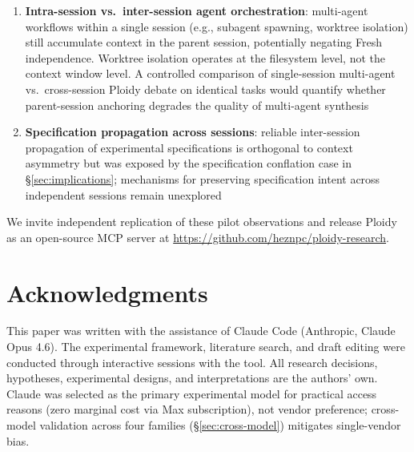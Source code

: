 \documentclass[11pt]{article}
\begin{document}
\begin{enumerate}[label=\arabic*., leftmargin=1.5em]
  \item \textbf{Intra-session vs.\ inter-session agent orchestration}: multi-agent workflows within a single session (e.g., subagent spawning, worktree isolation) still accumulate context in the parent session, potentially negating Fresh independence. Worktree isolation operates at the filesystem level, not the context window level. A controlled comparison of single-session multi-agent vs.\ cross-session Ploidy debate on identical tasks would quantify whether parent-session anchoring degrades the quality of multi-agent synthesis
  \item \textbf{Specification propagation across sessions}: reliable inter-session propagation of experimental specifications is orthogonal to context asymmetry but was exposed by the specification conflation case in \S\ref{sec:implications}; mechanisms for preserving specification intent across independent sessions remain unexplored
\end{enumerate}

We invite independent replication of these pilot observations and release Ploidy as an open-source MCP server at \url{https://github.com/heznpc/ploidy-research}.

\section*{Acknowledgments}

This paper was written with the assistance of Claude Code (Anthropic, Claude Opus 4.6). The experimental framework, literature search, and draft editing were conducted through interactive sessions with the tool. All research decisions, hypotheses, experimental designs, and interpretations are the authors' own. Claude was selected as the primary experimental model for practical access reasons (zero marginal cost via Max subscription), not vendor preference; cross-model validation across four families (\S\ref{sec:cross-model}) mitigates single-vendor bias.


\end{document}
